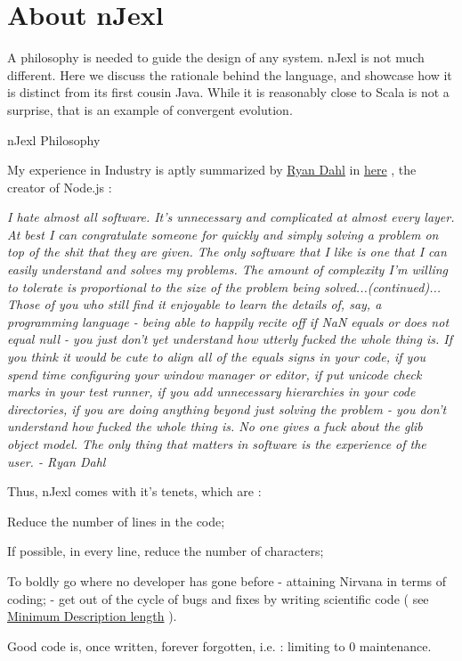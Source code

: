 \chapter{About nJexl}\label{nJexl}

{\LARGE A} philosophy is needed to guide the design of any system. nJexl is not much different.
Here we discuss the rationale behind the language, and showcase how it is distinct from its first cousin Java.
While it is reasonably close to Scala is not a surprise, that is an example of convergent evolution.

\begin{section}{nJexl Philosophy}

My experience in Industry is aptly summarized by \href{https://en.wikipedia.org/wiki/Node.js}{Ryan Dahl}
in \href{http://harmful.cat-v.org/software/node.js}{here} , the creator of Node.js :

\begin{center}
\emph{
I hate almost all software. It's unnecessary and complicated at almost every layer. At best I can congratulate someone for quickly and simply solving a problem on top of the shit that they are given. The only software that I like is one that I can easily understand and solves my problems. The amount of complexity I'm willing to tolerate is proportional to the size of the problem being solved...(continued)...
Those of you who still find it enjoyable to learn the details of, say, a programming language - being able to happily recite off if NaN equals or does not equal null - you just don't yet understand how utterly fucked the whole thing is. If you think it would be cute to align all of the equals signs in your code, if you spend time configuring your window manager or editor, if put unicode check marks in your test runner, if you add unnecessary hierarchies in your code directories, if you are doing anything beyond just solving the problem - you don't understand how fucked the whole thing is. No one gives a fuck about the glib object model.
\emph{The only thing that matters in software is the experience of the user.}   - Ryan Dahl
}
\end{center}

Thus, nJexl comes with it's tenets, which are :

\begin{enumerate}
\item{ Reduce the number of lines in the code; }
\item{ If possible, in every line, reduce the number of characters; }
\item{ To boldly go where no developer has gone before - attaining Nirvana in terms of coding;
    - get out of the cycle of bugs and fixes by writing scientific code 
    ( see  \href{http://en.wikipedia.org/wiki/Minimum_description_length}{Minimum Description length} ).
\item{Good code is, once written, forever forgotten, i.e. : limiting to 0 maintenance. }    
}
\end{enumerate}


\end{section}
